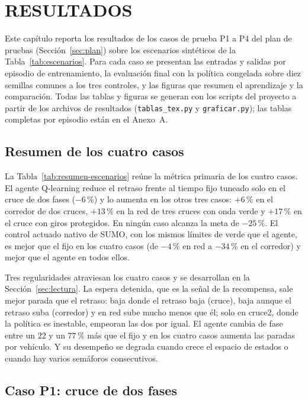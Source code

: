 \chapter{RESULTADOS}
\label{cap:resultados}

Este capítulo reporta los resultados de los casos de prueba P1 a P4 del
plan de pruebas (Sección~\ref{sec:plan}) sobre los escenarios sintéticos
de la Tabla~\ref{tab:escenarios}. Para cada caso se presentan las
entradas y salidas por episodio de entrenamiento, la evaluación final con
la política congelada sobre diez semillas comunes a los tres controles, y
las figuras que resumen el aprendizaje y la comparación. Todas las tablas
y figuras se generan con los scripts del proyecto a partir de los
archivos de resultados (\texttt{tablas\_tex.py} y \texttt{graficar.py});
las tablas completas por episodio están en el Anexo~A.

\section{Resumen de los cuatro casos}

La Tabla~\ref{tab:resumen-escenarios} reúne la métrica primaria de los
cuatro casos. El agente Q-learning reduce el retraso frente al tiempo
fijo tuneado solo en el cruce de dos fases ($-6\,\%$) y lo aumenta en
los otros tres casos: $+6\,\%$ en el corredor de dos cruces, $+13\,\%$
en la red de tres cruces con onda verde y $+17\,\%$ en el cruce con
giros protegidos. En ningún caso alcanza la meta de $-25\,\%$. El
control actuado nativo de SUMO, con los mismos límites de verde que el
agente, es mejor que el fijo en los cuatro casos (de $-4\,\%$ en red a
$-34\,\%$ en el corredor) y mejor que el agente en todos ellos.



Tres regularidades atraviesan los cuatro casos y se desarrollan en la
Sección~\ref{sec:lectura}. La espera detenida, que es la señal de la
recompensa, sale mejor parada que el retraso: baja donde el retraso baja
(cruce), baja aunque el retraso suba (corredor) y en red sube mucho
menos que él; solo en cruce2, donde la política es inestable, empeoran
las dos por igual. El agente cambia de fase entre un $22$ y un $77\,\%$
más que el fijo y en los cuatro casos aumenta las paradas por vehículo.
Y su desempeño se degrada cuando crece el espacio de estados o cuando
hay varios semáforos consecutivos.

\section{Caso P1: cruce de dos fases}

